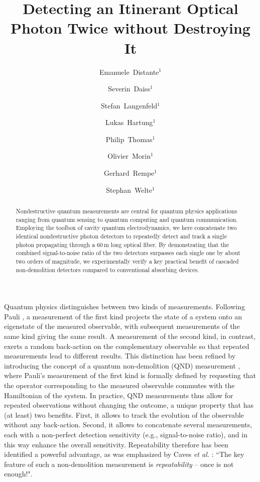 \documentclass[prl,twocolumn,amsmath,amssymb,bibnotes,aps,longbibliography]{revtex4-1}
\begin{document}
\title{Detecting an Itinerant Optical Photon Twice without Destroying It}

\author{Emanuele~Distante$^{1}$}
\author{Severin~Daiss$^{1}$}
\author{Stefan~Langenfeld$^{1}$}
\author{Lukas~Hartung$^{1}$}
\author{Philip~Thomas$^{1}$}
\author{Olivier~Morin$^{1}$}
\author{Gerhard~Rempe$^{1}$}
\author{Stephan~Welte$^{1}$}

\begin{abstract}
\noindent Nondestructive quantum measurements are central for quantum physics applications ranging from quantum sensing to quantum computing and quantum communication. Employing the toolbox of cavity quantum electrodynamics, we here concatenate two identical nondestructive photon detectors to repeatedly detect and track a single photon propagating through a $60\,\mathrm{m}$ long optical fiber. By demonstrating that the combined signal-to-noise ratio of the two detectors surpasses each single one by about two orders of magnitude, we experimentally verify a key practical benefit of cascaded non-demolition detectors compared to conventional absorbing devices.
\end{abstract}

\maketitle \nocite{apsrev41Control}

\noindent Quantum physics distinguishes between two kinds of measurements. Following Pauli \cite{pauli1933}, a measurement of the first kind projects the state of a system onto an eigenstate of the measured observable, with subsequent measurements of the same kind giving the same result. A measurement of the second kind, in contrast, exerts a random back-action on the complementary observable so that repeated measurements lead to different results. This distinction has been refined by introducing the concept of a quantum non-demolition (QND) measurement \cite{braginsky1980,braginsky1996}, where Pauli's measurement of the first kind is formally defined by requesting that the operator corresponding to the measured observable commutes with the Hamiltonian of the system. In practice, QND measurements thus allow for repeated observations without changing the outcome, a unique property that has (at least) two benefits. First, it allows to track the evolution of the observable without any back-action. Second, it allows to concatenate several measurements, each with a non-perfect detection sensitivity (e.g., signal-to-noise ratio), and in this way enhance the overall sensitivity. Repeatability therefore has been identified a powerful advantage, as was emphasized by Caves \textit{et al.} \cite{caves1980}: ``The key feature of such a non-demolition measurement is \textit{repeatability} -- once is not enough!".
\end{document}

